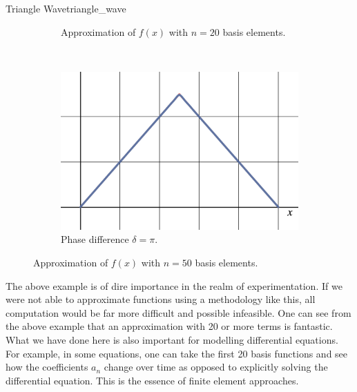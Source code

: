 \begin{ex}{Triangle Wave}{triangle_wave}
\begin{figure}[H]
\begin{subfigure}[h]{0.49\textwidth}
			\caption{Approximation of $f(x)$ with $n=20$ basis elements.}
		\end{subfigure}
		~
		\begin{subfigure}[h]{0.49\textwidth}
			\centering
			\includegraphics[width=.8\textwidth]{Figures_Part_5/triangle_n=50.png}
			\caption{Phase difference $\delta=\pi$.}
		\end{subfigure}
	\caption{Approximation of $f(x)$ with $n=50$ basis elements.}
	\end{figure}

	The above example is of dire importance in the realm of experimentation.  If we were not able to approximate functions using a methodology like this, all computation would be far more difficult and possible infeasible. One can see from the above example that an approximation with 20 or more terms is fantastic.  What we have done here is also important for modelling differential equations. For example, in some equations, one can take the first 20 basis functions and see how the coefficients $a_n$ change over time as opposed to explicitly solving the differential equation. This is the essence of finite element approaches.
\end{ex}


	
	
